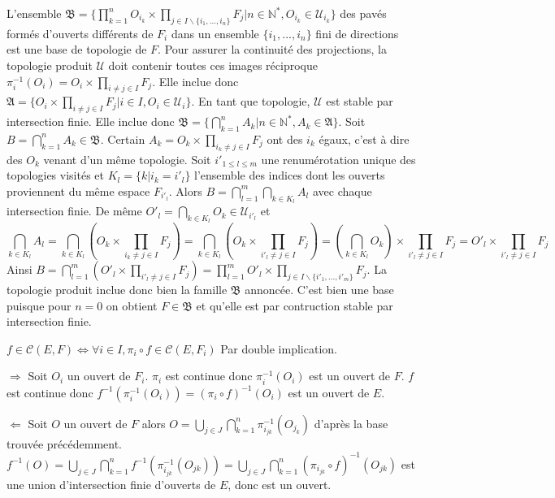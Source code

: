 \documentclass[a4paper, 11pt, french]{book}
\newenvironment{itemise}{\itemize}{\enditemize}
\theoremstyle{plain} %
\theoremstyle{definition} %
\theoremstyle{remark} %
\renewcommand{\setminus}{\backslash}
\newcommand{\1}{\mathds{1}}
\newcommand{\cont}{\mathcal{C}}
\newcommand{\infegal}{\leqslant}
\newcommand{\inv}[1]{#1^{-1}}
\newcommand{\N}{\mathbb{N}}
\begin{document}
\proposition
L'ensemble $\mathfrak{B}=\{\prod_{k=1}^nO_{i_k}\times\prod_{j\in I\setminus\{i_1, ..., i_n\}}F_j|n\in\N^*, O_{i_k}\in\mathscr{U}_{i_k}\}$ des pavés formés d'ouverts différents de $F_i$ dans un ensemble $\{i_1,...,i_n\}$ fini de directions est une base de topologie de $F$.
\demonstration
Pour assurer la continuité des projections, la topologie produit $\mathscr{U}$ doit contenir toutes ces images réciproque $\inv{\pi_i}(O_i)=O_i\times\prod_{i\neq j\in I}F_j$.
Elle inclue donc $\mathfrak{A}=\{O_i\times\prod_{i\neq j\in I}F_j|i\in I, O_i\in\mathscr{U}_i\}$.
En tant que topologie, $\mathscr{U}$ est stable par intersection finie.
Elle inclue donc $\mathfrak{B}=\{\bigcap_{k=1}^nA_k|n\in\N^*, A_k\in\mathfrak{A}\}$.
Soit $B=\bigcap_{k=1}^nA_k\in\mathfrak{B}$.
Certain $A_k=O_k\times\prod_{i_k\neq j\in I}F_j$ ont des $i_k$ égaux, c'est à dire des $O_k$ venant d'un même topologie.
Soit $i'_{1\infegal l\infegal m}$ une renumérotation unique des topologies visités et $K_l=\{k|i_k=i'_l\}$ l'ensemble des indices dont les ouverts proviennent du même espace $F_{i'_l}$.
Alors $B=\bigcap_{l=1}^m\bigcap_{k\in K_l}A_l$ avec chaque intersection finie.
De même $O'_l=\bigcap_{k\in K_l}O_k\in\mathscr{U}_{i'_l}$ et
$$
\bigcap_{k\in K_l}A_l
=\bigcap_{k\in K_l}(O_k\times\prod_{i_k\neq j\in I}F_j)
=\bigcap_{k\in K_l}(O_k\times\prod_{i'_l\neq j\in I}F_j)
=(\bigcap_{k\in K_l}O_k)\times\prod_{i'_l\neq j\in I}F_j
=O'_l\times\prod_{i'_l\neq j\in I}F_j
$$
Ainsi $B=\bigcap_{l=1}^m(O'_l\times\prod_{i'_l\neq j\in I}F_j)=\prod_{l=1}^mO'_l\times\prod_{j\in I\setminus\{i'_1,...,i'_m\}}F_j$.
La topologie produit inclue donc bien la famille $\mathfrak{B}$ annoncée.
C'est bien une base puisque pour $n=0$ on obtient $F\in\mathfrak{B}$ et qu'elle est par contruction stable par intersection finie.

\proposition
$f\in\cont(E, F)\iff\forall i\in I, \pi_i\circ f\in\cont(E, F_i)$
\demonstration
Par double implication.
\begin{itemise}
	 \item[$\Rightarrow$] Soit $O_i$ un ouvert de $F_i$.
	$\pi_i$ est continue donc $\inv{\pi_i}(O_i)$ est un ouvert de $F$.
	$f$ est continue donc $\inv{f}(\inv{\pi_i}(O_i))=\inv{(\pi_i\circ f)}(O_i)$ est un ouvert de $E$.
	 \item[$\Leftarrow$] Soit $O$ un ouvert de $F$ alors $O=\bigcup_{j\in J}\bigcap_{k=1}^n\inv{\pi_{i_{jk}}}(O_{j_k})$ d'après la base trouvée précédemment.
	$\inv{f}(O)=\bigcup_{j\in J}\bigcap_{k=1}^n\inv{f}(\inv{\pi_{i_{jk}}}(O_{jk}))=\bigcup_{j\in J}\bigcap_{k=1}^n\inv{(\pi_{i_{jk}}\circ f)}(O_{jk})$ est une union d'intersection finie d'ouverts de $E$, donc est un ouvert.
\end{itemise}
\end{document}
